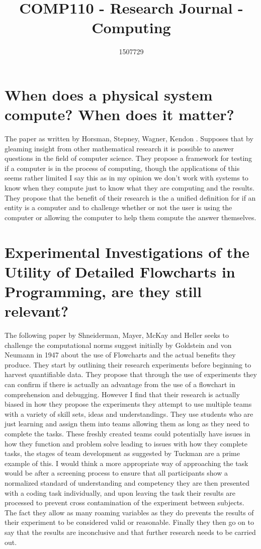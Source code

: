 \documentclass{scrartcl}
\title{COMP110 - Research Journal - Computing}
\author{1507729}
\begin{document}
\maketitle

\section{When does a physical system compute? When does it matter?}
The paper as written by Horsman, Stepney, Wagner, Kendon \cite{horsman2014does}. Supposes that by gleaming insight from other mathematical research it is possible to answer questions in the field of computer science. They propose a framework for testing if a computer is in the process of computing, though the applications of this seems rather limited I say this as in my opinion we don't work with systems to know when they compute just to know what they are computing and the results. They propose that the benefit of their research is the a unified definition for if an entity is a computer and to challenge whether or not the user is using the computer or allowing the computer to help them compute the answer themselves.

\section{Experimental Investigations of the Utility of Detailed Flowcharts in Programming, are they still relevant?}
The following paper by Shneiderman, Mayer, McKay and Heller \cite{shneiderman1977experimental}  seeks to challenge the computational norms suggest initially by Goldstein and von Neumann \cite{goldstein5planning} in 1947 about the use of Flowcharts and the actual benefits they produce. They start by outlining their research experiments before beginning to harvest quantifiable data. They propose that through the use of experiments they can confirm if there is actually an advantage from the use of a flowchart in comprehension and debugging. However I find that their research is actually biased in how they propose the experiments they attempt to use multiple teams with a variety of skill sets, ideas and understandings. They use students who are just learning and assign them into teams allowing them as long as they need to complete the tasks. These freshly created teams could potentially have issues in how they function and problem solve leading to issues with how they complete tasks, the stages of team development as suggested by Tuckman \cite{Tuckman} are a prime example of this.  I would think a more appropriate way of approaching the task would be after a screening process to ensure that all participants show a normalized standard of understanding and competency they are then presented with a coding task individually, and upon leaving the task their results are processed to prevent cross contamination of the experiment between subjects. The fact they allow as many roaming variables as they do prevents the results of their experiment to be considered valid or reasonable. Finally they then go on to say that the results are inconclusive and that further research needs to be carried out.
\end{document}
